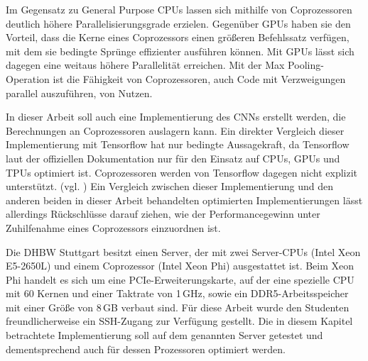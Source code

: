 \documentclass[../main.tex]{subfiles}
\begin{document}
Im Gegensatz zu General Purpose CPUs lassen sich mithilfe von Coprozessoren deutlich höhere Parallelisierungsgrade erzielen. Gegenüber GPUs haben sie den Vorteil, dass die Kerne eines Coprozessors einen größeren Befehlssatz verfügen, mit dem sie bedingte Sprünge effizienter ausführen können. Mit GPUs lässt sich dagegen eine weitaus höhere Parallelität erreichen. Mit der Max Pooling-Operation ist die Fähigkeit von Coprozessoren, auch Code mit Verzweigungen parallel auszuführen, von Nutzen. 

In dieser Arbeit soll auch eine Implementierung des CNNs erstellt werden, die Berechnungen an Coprozessoren auslagern kann. Ein direkter Vergleich dieser Implementierung mit Tensorflow hat nur bedingte Aussagekraft, da Tensorflow laut der offiziellen Dokumentation nur für den Einsatz auf CPUs, GPUs und TPUs optimiert ist. Coprozessoren werden von Tensorflow dagegen nicht explizit unterstützt. (vgl. \cite{aboutTensorflow}) Ein Vergleich zwischen dieser Implementierung und den anderen beiden in dieser Arbeit behandelten optimierten Implementierungen lässt allerdings Rückschlüsse darauf ziehen, wie der Performancegewinn unter Zuhilfenahme eines Coprozessors einzuordnen ist. 

Die DHBW Stuttgart besitzt einen Server, der mit zwei Server-CPUs (Intel Xeon E5-2650L) und einem Coprozessor (Intel Xeon Phi) ausgestattet ist. Beim Xeon Phi handelt es sich um eine PCIe-Erweiterungskarte, auf der eine spezielle CPU mit 60 Kernen und einer Taktrate von 1\,GHz, sowie ein DDR5-Arbeitsspeicher mit einer Größe von 8\,GB verbaut sind. Für diese Arbeit wurde den Studenten freundlicherweise ein SSH-Zugang zur Verfügung gestellt. Die in diesem Kapitel betrachtete Implementierung soll auf dem genannten Server getestet und dementsprechend auch für dessen Prozessoren optimiert werden. 
\end{document}
